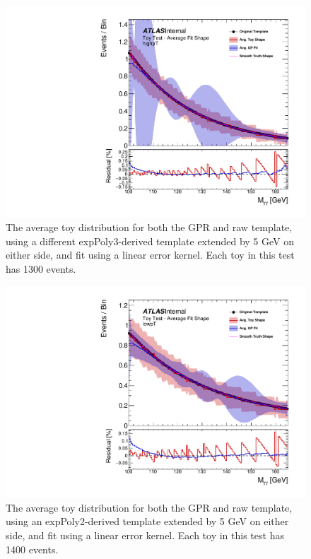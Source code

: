\begin{figure} 
\begin{center}
  \includegraphics[width=\textwidth]{figures/background/gpr/validation/linear/ToyTest_AvgFitShape_highpT_1300_noSig}   
\caption{The average toy distribution for both the GPR and raw template, using a different expPoly3-derived template extended by 5 GeV on either side, and fit using a linear error kernel. Each toy in this test has 1300 events.}
\label{fig:linearkernel_highpt_1300_noSig}
\end{center}
\end{figure}

\begin{figure} 
\begin{center}
  \includegraphics[width=\textwidth]{figures/background/gpr/validation/linear/ToyTest_AvgFitShape_lowpT_1400_noSig}   
\caption{The average toy distribution for both the GPR and raw template, using an expPoly2-derived template extended by 5 GeV on either side, and fit using a linear error kernel. Each toy in this test has 1400 events.}
\label{fig:linearkernel_lowpt_1400_noSig}
\end{center}
\end{figure}

